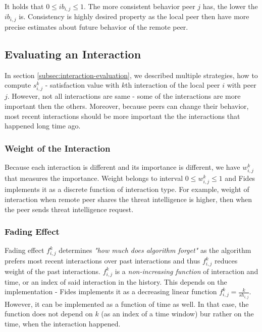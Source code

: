 It holds that $0 \leq ib_{i,j} \leq 1$.
The more consistent behavior peer $j$ has, the lower the $ib_{i,j}$ is. Consistency is highly desired property as the local peer then have more precise estimates about future behavior of the remote peer.

\subsection{Evaluating an Interaction}
\label{subsec:evaluating-an-interaction}
In section \ref{subsec:interaction-evaluation}, we described multiple strategies, how to compute $s^{k}_{i,j}$ - satisfaction value with $k$th interaction of the local peer $i$ with peer $j$.
However, not all interactions are same - some of the interactions are more important then the others. 
Moreover, because peers can change their behavior, most recent interactions should be more important the the interactions that happened long time ago.

\subsubsection{Weight of the Interaction}
Because each interaction is different and its importance is different, we have $w^{k}_{i,j}$ that measures the importance.
Weight belongs to interval $0 \leq w^{k}_{i,j} \leq 1$ and Fides implements it as a discrete function of interaction type. 
For example, weight of interaction when remote peer shares the threat intelligence is higher, then when the peer sends threat intelligence request.


\subsubsection{Fading Effect}
Fading effect $f^{k}_{i,j}$ determines \textit{"how much does algorithm forget"} as the algorithm prefers most recent interactions over past interactions and thus $f^{k}_{i,j}$ reduces weight of the past interactions. 
$f^{k}_{i,j}$ is a \textit{non-increasing function} of interaction and time, or an index of said interaction in the history.
This depends on the implementation - Fides implements it as a decreasing linear function $f^{k}_{i,j} = \frac{k}{sh_{i,j}}$. 
However, it can be implemented as a function of time as well. In that case, the function does not depend on $k$ (as an index of a time window) bur rather on the time, when the interaction happened.

